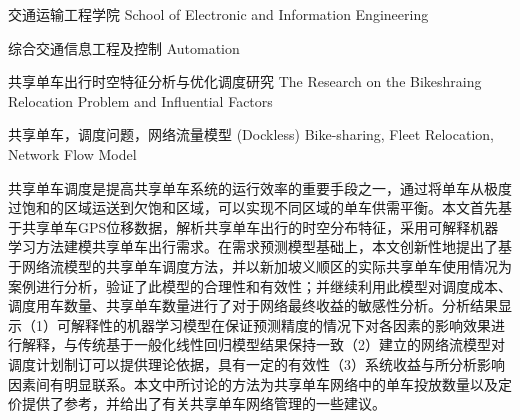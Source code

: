 \documentclass[]{tongjithesis}
\numberwithin{equation}{chapter}
\begin{document}
\school
{交通运输工程学院}
{School of Electronic and Information Engineering}

\major
{综合交通信息工程及控制}
{Automation}

\thesistitle
{共享单车出行时空特征分析与优化调度研究}
{}
{The Research on the Bikeshraing Relocation Problem and Influential Factors }
{}




\keyword
{共享单车，调度问题，网络流量模型}
{(Dockless) Bike-sharing, Fleet Relocation, Network Flow Model}



\maketitle



\begin{cabstract}
	共享单车调度是提高共享单车系统的运行效率的重要手段之一，通过将单车从极度过饱和的区域运送到欠饱和区域，可以实现不同区域的单车供需平衡。本文首先基于共享单车GPS位移数据，解析共享单车出行的时空分布特征，采用可解释机器学习方法建模共享单车出行需求。在需求预测模型基础上，本文创新性地提出了基于网络流模型的共享单车调度方法，并以新加坡义顺区的实际共享单车使用情况为案例进行分析，验证了此模型的合理性和有效性；并继续利用此模型对调度成本、调度用车数量、共享单车数量进行了对于网络最终收益的敏感性分析。分析结果显示（1）可解释性的机器学习模型在保证预测精度的情况下对各因素的影响效果进行解释，与传统基于一般化线性回归模型结果保持一致（2）建立的网络流模型对调度计划制订可以提供理论依据，具有一定的有效性（3）系统收益与所分析影响因素间有明显联系。本文中所讨论的方法为共享单车网络中的单车投放数量以及定价提供了参考，并给出了有关共享单车网络管理的一些建议。
\end{cabstract}
\end{document}
